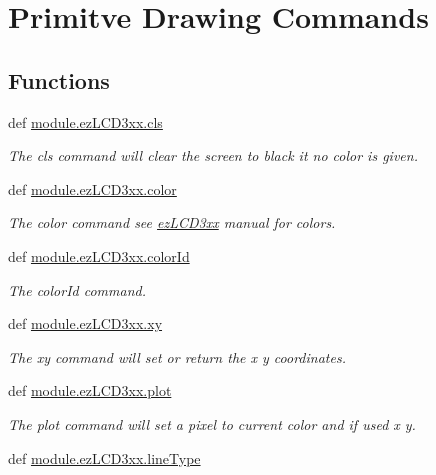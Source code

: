 \hypertarget{group___drawing}{\section{Primitve Drawing Commands}
\label{group___drawing}
}
\subsection*{Functions}
\begin{DoxyCompactItemize}
\item 
def \hyperlink{group___drawing_ga3524b7a565ceaa5e5290a94e870073be}{module.\-ez\-L\-C\-D3xx.\-cls}
\begin{DoxyCompactList}\small\item\em The cls command will clear the screen to black it no color is given. \end{DoxyCompactList}\item 
def \hyperlink{group___drawing_ga39b2d04e242f81f928f6e130e6fab2c7}{module.\-ez\-L\-C\-D3xx.\-color}
\begin{DoxyCompactList}\small\item\em The color command see \hyperlink{namespacemodule_1_1ez_l_c_d3xx}{ez\-L\-C\-D3xx} manual for colors. \end{DoxyCompactList}\item 
def \hyperlink{group___drawing_ga08d8eb362a01b246033c3ec2a5944dd3}{module.\-ez\-L\-C\-D3xx.\-color\-Id}
\begin{DoxyCompactList}\small\item\em The color\-Id command. \end{DoxyCompactList}\item 
def \hyperlink{group___drawing_ga93fdd029cb3a4fd28f006d9dac12de14}{module.\-ez\-L\-C\-D3xx.\-xy}
\begin{DoxyCompactList}\small\item\em The xy command will set or return the x y coordinates. \end{DoxyCompactList}\item 
def \hyperlink{group___drawing_gaad72ea59743ea85183832ede89d9eb22}{module.\-ez\-L\-C\-D3xx.\-plot}
\begin{DoxyCompactList}\small\item\em The plot command will set a pixel to current color and if used x y. \end{DoxyCompactList}\item 
def \hyperlink{group___drawing_gafbc7a80b227e1e7d9fb6a587a63aaba3}{module.\-ez\-L\-C\-D3xx.\-line\-Type}

\end{DoxyCompactItemize}
